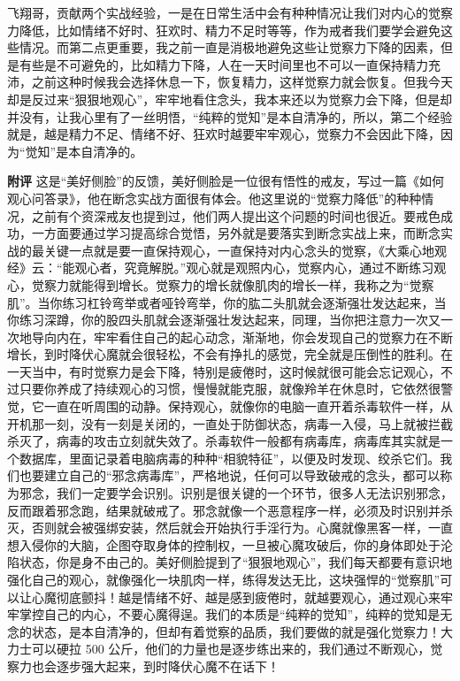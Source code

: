 \begin{case}
\end{case}

\begin{case}
    飞翔哥，贡献两个实战经验，一是在日常生活中会有种种情况让我们对内心的觉察力降低，比如情绪不好时、狂欢时、精力不足时等等，作为戒者我们要学会避免这些情况。而第二点更重要，我之前一直是消极地避免这些让觉察力下降的因素，但是有些是不可避免的，比如精力下降，人在一天时间里也不可以一直保持精力充沛，之前这种时候我会选择休息一下，恢复精力，这样觉察力就会恢复。但我今天却是反过来“狠狠地观心”，牢牢地看住念头，我本来还以为觉察力会下降，但是却并没有，让我心里有了一丝明悟，“纯粹的觉知”是本自清净的，所以，第二个经验就是，越是精力不足、情绪不好、狂欢时越要牢牢观心，觉察力不会因此下降，因为“觉知”是本自清净的。

    \textbf{附评} 这是“美好侧脸”的反馈，美好侧脸是一位很有悟性的戒友，写过一篇《如何观心问答录》，他在断念实战方面很有体会。他这里说的“觉察力降低”的种种情况，之前有个资深戒友也提到过，他们两人提出这个问题的时间也很近。要戒色成功，一方面要通过学习提高综合觉悟，另外就是要落实到断念实战上来，而断念实战的最关键一点就是要一直保持观心，一直保持对内心念头的觉察，《大乘心地观经》云：“能观心者，究竟解脱。”观心就是观照内心，觉察内心，通过不断练习观心，觉察力就能得到增长。觉察力的增长就像肌肉的增长一样，我称之为“觉察肌”。当你练习杠铃弯举或者哑铃弯举，你的肱二头肌就会逐渐强壮发达起来，当你练习深蹲，你的股四头肌就会逐渐强壮发达起来，同理，当你把注意力一次又一次地导向内在，牢牢看住自己的起心动念，渐渐地，你会发现自己的觉察力在不断增长，到时降伏心魔就会很轻松，不会有挣扎的感觉，完全就是压倒性的胜利。在一天当中，有时觉察力是会下降，特别是疲倦时，这时候就很可能会忘记观心，不过只要你养成了持续观心的习惯，慢慢就能克服，就像羚羊在休息时，它依然很警觉，它一直在听周围的动静。保持观心，就像你的电脑一直开着杀毒软件一样，从开机那一刻，没有一刻是关闭的，一直处于防御状态，病毒一入侵，马上就被拦截杀灭了，病毒的攻击立刻就失效了。杀毒软件一般都有病毒库，病毒库其实就是一个数据库，里面记录着电脑病毒的种种“相貌特征”，以便及时发现、绞杀它们。我们也要建立自己的“邪念病毒库”，严格地说，任何可以导致破戒的念头，都可以称为邪念，我们一定要学会识别。识别是很关键的一个环节，很多人无法识别邪念，反而跟着邪念跑，结果就破戒了。邪念就像一个恶意程序一样，必须及时识别并杀灭，否则就会被强绑安装，然后就会开始执行手淫行为。心魔就像黑客一样，一直想入侵你的大脑，企图夺取身体的控制权，一旦被心魔攻破后，你的身体即处于沦陷状态，你是身不由己的。美好侧脸提到了“狠狠地观心”，我们每天都要有意识地强化自己的观心，就像强化一块肌肉一样，练得发达无比，这块强悍的“觉察肌”可以让心魔彻底颤抖！越是情绪不好、越是感到疲倦时，就越要观心，通过观心来牢牢掌控自己的内心，不要心魔得逞。我们的本质是“纯粹的觉知”，纯粹的觉知是无念的状态，是本自清净的，但却有着觉察的品质，我们要做的就是强化觉察力！大力士可以硬拉 500 公斤，他们的力量也是逐步练出来的，我们通过不断观心，觉察力也会逐步强大起来，到时降伏心魔不在话下！
\end{case}

